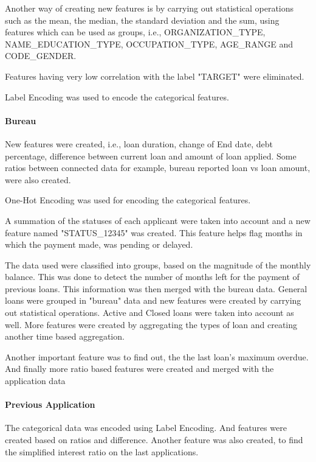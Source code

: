 \documentclass[sigconf, nonacm]{acmart}
\begin{document}
Another way of creating new features is by carrying out statistical operations such as the mean, the median, the standard deviation and the sum, using features which can be used as groups, i.e., ORGANIZATION\_TYPE, NAME\_EDUCATION\_TYPE, OCCUPATION\_TYPE, AGE\_RANGE and CODE\_GENDER.

Features having very low correlation with the label "TARGET" were eliminated.

Label Encoding\cite{pandas.factorize} was used to encode the categorical features.

\paragraph{Bureau}

New features were created, i.e., loan duration, change of End date, debt percentage, difference between current loan and amount of loan applied. Some ratios between connected data for example, bureau reported loan vs loan amount, were also created.

One-Hot Encoding\cite{sklearn.preprocessing.onehotencoder} was used for encoding the categorical features.

A summation of the statuses of each applicant were taken into account and a new feature named "STATUS\_12345" was created. This feature helps flag months in which the payment made, was pending or delayed.

The data used were classified into groups, based on the magnitude of the monthly balance. This was done to detect the number of months left for the payment of previous loans. This information was then merged with the bureau data. General loans were grouped in "bureau" data and new features were created by carrying out statistical operations. Active and Closed loans were taken into account as well. More features were created by aggregating the types of loan and creating another time based aggregation.

Another important feature was to find out, the the last loan's maximum overdue. And finally more ratio based features were created and merged with the application data

\paragraph{Previous Application}

The categorical data was encoded using Label Encoding\cite{pandas.factorize}. And features were created based on ratios and difference. Another feature was also created, to find the simplified interest ratio on the last applications.
\end{document}
